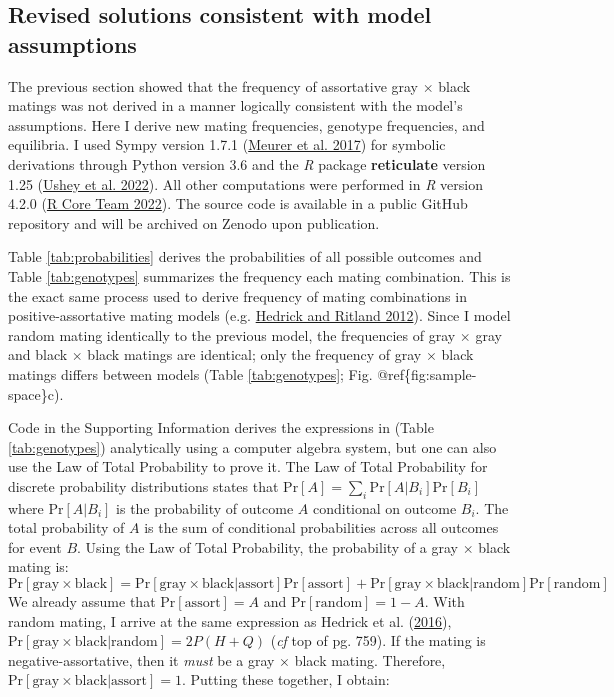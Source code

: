 \documentclass[
]{article}
\begin{document}
\hypertarget{revised-solutions-consistent-with-model-assumptions}{%
\subsection{Revised solutions consistent with model assumptions}\label{revised-solutions-consistent-with-model-assumptions}}

The previous section showed that the frequency of assortative gray \(\times\) black matings was not derived in a manner logically consistent with the model's assumptions. Here I derive new mating frequencies, genotype frequencies, and equilibria. I used Sympy version 1.7.1 (\protect\hyperlink{ref-meurer_sympy:_2017}{Meurer et al. 2017}) for symbolic derivations through Python version 3.6 and the \emph{R} package \textbf{reticulate} version 1.25 (\protect\hyperlink{ref-ushey_reticulate_2022}{Ushey et al. 2022}). All other computations were performed in \emph{R} version 4.2.0 (\protect\hyperlink{ref-r_core_team_r:_2022}{R Core Team 2022}). The source code is available in a public GitHub repository and will be archived on Zenodo upon publication.

Table \ref{tab:probabilities} derives the probabilities of all possible outcomes and Table \ref{tab:genotypes} summarizes the frequency each mating combination. This is the exact same process used to derive frequency of mating combinations in positive-assortative mating models (e.g. \protect\hyperlink{ref-hedrick_population_2012}{Hedrick and Ritland 2012}). Since I model random mating identically to the previous model, the frequencies of gray \(\times\) gray and black \(\times\) black matings are identical; only the frequency of gray \(\times\) black matings differs between models (Table \ref{tab:genotypes}; Fig. @ref\{fig:sample-space\}c).

Code in the Supporting Information derives the expressions in (Table \ref{tab:genotypes}) analytically using a computer algebra system, but one can also use the Law of Total Probability to prove it. The Law of Total Probability for discrete probability distributions states that \(\mathrm{Pr}[A] = \sum_i \mathrm{Pr}[A|B_i] \mathrm{Pr}[B_i]\) where \(\mathrm{Pr}[A|B_i]\) is the probability of outcome \(A\) conditional on outcome \(B_i\). The total probability of \(A\) is the sum of conditional probabilities across all outcomes for event \(B\). Using the Law of Total Probability, the probability of a gray \(\times\) black mating is:
\[\mathrm{Pr}[\textrm{gray} \times \textrm{black}] = \mathrm{Pr}[\textrm{gray} \times \textrm{black}|\textrm{assort}] \mathrm{Pr}[\textrm{assort}] + \mathrm{Pr}[\textrm{gray} \times \textrm{black}|\textrm{random}] \mathrm{Pr}[\textrm{random}]\]
We already assume that \(\mathrm{Pr}[\textrm{assort}] = A\) and \(\mathrm{Pr}[\textrm{random}] = 1 - A\). With random mating, I arrive at the same expression as Hedrick et al. (\protect\hyperlink{ref-hedrick_negative-assortative_2016}{2016}), \(\mathrm{Pr}[\textrm{gray} \times \textrm{black}|\textrm{random}] = 2P(H+Q)\) (\emph{cf} top of pg. 759). If the mating is negative-assortative, then it \emph{must} be a gray \(\times\) black mating. Therefore, \(\mathrm{Pr}[\textrm{gray} \times \textrm{black}|\textrm{assort}] = 1\). Putting these together, I obtain:
\end{document}
